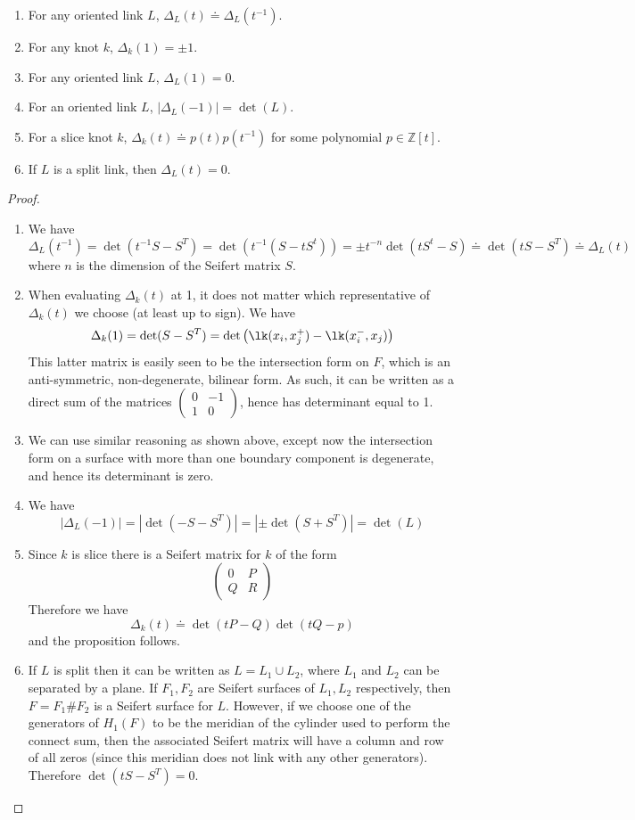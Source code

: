 \begin{prop}
\sloppyspace
\begin{enumerate}
	\item For any oriented link $L$, $\Delta_L(t) \dotequal \Delta_L(t^{-1})$.
	\item For any knot $k$, $\Delta_k(1) = \pm 1$.
	\item For any oriented link $L$, $\Delta_L(1) = 0$.
	\item For an oriented link $L$, $|\Delta_L(-1)| = \det(L)$.
	\item For a slice knot $k$, $\Delta_k(t) \dotequal p(t)p(t^{-1})$ for some polynomial $p \in \mathbb Z[t]$.
	\item If $L$ is a split link, then $\Delta_L(t)=0$.
\end{enumerate}
\end{prop}
\begin{proof}
\sloppyspace
\begin{enumerate}
	\item We have
	\[ \Delta_L(t^{-1}) = \det(t^{-1} S - S^T) = \det(t^{-1} (S - t S^t)) = \pm t^{-n} \det(t S^t - S) \dotequal \det(tS-S^T) \dotequal \Delta_L(t) \]
	where $n$ is the dimension of the Seifert matrix $S$. 
	\item When evaluating $\Delta_k(t)$ at 1, it does not matter which representative of $\Delta_k(t)$ we choose (at least up to sign). We have
	\[ \Delta_k(1) = \det(S-S^T) = \det\left( \lk(x_i,x_j^+) - \lk(x_i^-,x_j) \right) \]
	This latter matrix is easily seen to be the intersection form on $F$, which is an anti-symmetric, non-degenerate, bilinear form. As such, it can be written as a direct sum of the matrices $\begin{pmatrix} 0 & -1 \\ 1 & 0 \end{pmatrix}$, hence has determinant equal to 1.
	\item We can use similar reasoning as shown above, except now the intersection form on a surface with more than one boundary component is degenerate, and hence its determinant is zero.
	\item We have
	\[ |\Delta_L(-1)| = |\det(-S-S^T)| = |\pm \det(S+S^T)| = \det(L) \]
	\item Since $k$ is slice there is a Seifert matrix for $k$ of the form
	\[ \begin{pmatrix} 0 & P \\ Q & R \end{pmatrix} \]
	Therefore we have
	\[ \Delta_k(t) \dotequal \det(tP-Q)\det(tQ-p) \]
	and the proposition follows.
	\item If $L$ is split then it can be written as $L = L_1 \cup L_2$, where $L_1$ and $L_2$ can be separated by a plane. If $F_1,F_2$ are Seifert surfaces of $L_1,L_2$ respectively, then $F = F_1 \# F_2$ is a Seifert surface for $L$. However, if we choose one of the generators of $H_1(F)$ to be the meridian of the cylinder used to perform the connect sum, then the associated Seifert matrix will have a column and row of all zeros (since this meridian does not link with any other generators). Therefore $\det(tS-S^T)=0$.
\end{enumerate}
\end{proof}


